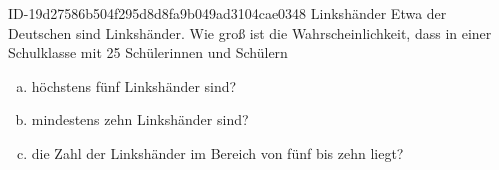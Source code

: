 \begin{exercise}
      {ID-19d27586b504f295d8d8fa9b049ad3104cae0348}
      {Linkshänder}
  \ifproblem\problem
    Etwa  der Deutschen sind Linkshänder. Wie groß ist die
    Wahrscheinlichkeit, dass in einer Schulklasse mit 25 Schülerinnen und
    Schülern
    \begin{enumerate}[a)]
      \item höchstens fünf Linkshänder sind?
      \item mindestens zehn Linkshänder sind?
      \item die Zahl der Linkshänder im Bereich von fünf bis zehn liegt?
    \end{enumerate}
  \fi
\end{exercise}
